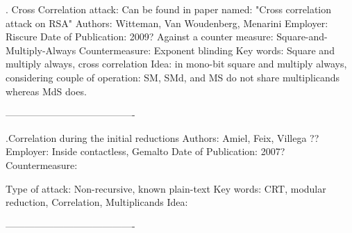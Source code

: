 . Cross Correlation attack:
Can be found in paper named:
 				                          		     "Cross correlation attack on RSA"
Authors:
 	                                                                           Witteman, Van Woudenberg, Menarini
Employer:        
                                                                                                                            Riscure
Date of Publication:
         2009?
Against a counter measure:
 Square-and-Multiply-Always 
Countermeasure:  
                                                                                                      			    Exponent blinding
Key words: 	
		                 		                         Square and multiply always, cross correlation
Idea:                                       in mono-bit square and multiply always, considering couple of operation: 
     SM, SMd, and MS do not share multiplicands whereas MdS does.


----------------------------------------


.Correlation during the initial reductions
Authors: 
	                                	                                                                           Amiel, Feix, Villega ??
Employer:
                                                                                       			 Inside contactless, Gemalto
Date of Publication:
       			                             						         2007?
Countermeasure:
                                                                                     
Type of attack:
								       Non-recursive, known plain-text
Key words:
			             	             CRT, modular reduction, Correlation, Multiplicands
Idea:
	                          

				
----------------------------------------





















